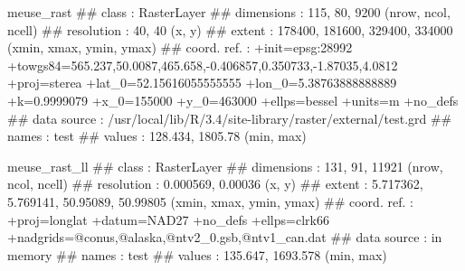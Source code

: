 \documentclass[11pt,ignorenonframetext,]{beamer}
\newenvironment{Shaded}{}{}
\newcommand{\NormalTok}[1]{#1}
\let\oldShaded\Shaded
\let\endoldShaded\endShaded
\renewenvironment{Shaded}{\footnotesize\begin{spacing}{0.9}\oldShaded}{\endoldShaded\end{spacing}}
\begin{document}
\begin{frame}[fragile,t]{}
\protect\hypertarget{section-8}{}

\scriptsize

\begin{Shaded}
\begin{Highlighting}[]
\NormalTok{meuse_rast}
\NormalTok{## class       : RasterLayer }
\NormalTok{## dimensions  : 115, 80, 9200  (nrow, ncol, ncell)}
\NormalTok{## resolution  : 40, 40  (x, y)}
\NormalTok{## extent      : 178400, 181600, 329400, 334000  (xmin, xmax, ymin, ymax)}
\NormalTok{## coord. ref. : +init=epsg:28992 +towgs84=565.237,50.0087,465.658,-0.406857,0.350733,-1.87035,4.0812 +proj=sterea +lat_0=52.15616055555555 +lon_0=5.38763888888889 +k=0.9999079 +x_0=155000 +y_0=463000 +ellps=bessel +units=m +no_defs }
\NormalTok{## data source : /usr/local/lib/R/3.4/site-library/raster/external/test.grd }
\NormalTok{## names       : test }
\NormalTok{## values      : 128.434, 1805.78  (min, max)}

\NormalTok{meuse_rast_ll}
\NormalTok{## class       : RasterLayer }
\NormalTok{## dimensions  : 131, 91, 11921  (nrow, ncol, ncell)}
\NormalTok{## resolution  : 0.000569, 0.00036  (x, y)}
\NormalTok{## extent      : 5.717362, 5.769141, 50.95089, 50.99805  (xmin, xmax, ymin, ymax)}
\NormalTok{## coord. ref. : +proj=longlat +datum=NAD27 +no_defs +ellps=clrk66 +nadgrids=@conus,@alaska,@ntv2_0.gsb,@ntv1_can.dat }
\NormalTok{## data source : in memory}
\NormalTok{## names       : test }
\NormalTok{## values      : 135.647, 1693.578  (min, max)}
\end{Highlighting}
\end{Shaded}

\end{frame}
\end{document}

